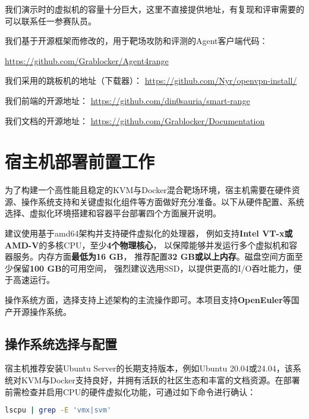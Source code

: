 \documentclass[lang=cn,10pt]{elegantbook}
\begin{document}
我们演示时的虚拟机的容量十分巨大，这里不直接提供地址，有复现和评审需要的可以联系任一参赛队员。

我们基于开源框架而修改的，用于靶场攻防和评测的Agent客户端代码：

\href{https://github.com/Grablocker/Agent4range}{https://github.com/Grablocker/Agent4range}

我们采用的跳板机的地址（下载器）：
\href{https://github.com/Nyr/openvpn-install/}{https://github.com/Nyr/openvpn-install/}

我们前端的开源地址：
\href{https://github.com/din0sauria/smart_range}{https://github.com/din0sauria/smart-range}

我们文档的开源地址：
\href{https://github.com/Grablocker/Documentation}{https://github.com/Grablocker/Documentation}





\section{宿主机部署前置工作}

为了构建一个高性能且稳定的KVM与Docker混合靶场环境，宿主机需要在硬件资源、操作系统支持和关键虚拟化组件等方面做好充分准备。以下从硬件配置、系统选择、虚拟化环境搭建和容器平台部署四个方面展开说明。

\begin{proposition}
  建议使用基于amd64架构并支持硬件虚拟化的处理器，
  例如支持\textbf{Intel VT-x或AMD-V}的多核CPU，至少\textbf{4个物理核心}，
  以保障能够并发运行多个虚拟机和容器服务。内存方面\textbf{最低为16 GB}，
  推荐配置\textbf{32 GB或以上内存}。磁盘空间方面至少保留\textbf{100 GB}的可用空间，
  强烈建议选用SSD，以提供更高的I/O吞吐能力，便于高速运行。
  
  操作系统方面，选择支持上述架构的主流操作即可。本项目支持\textbf{OpenEuler}等国产开源操作系统。
\end{proposition}


\subsection{操作系统选择与配置}

宿主机推荐安装Ubuntu Server的长期支持版本，例如Ubuntu 20.04或24.04，该系统对KVM与Docker支持良好，并拥有活跃的社区生态和丰富的文档资源。在部署前需检查并启用CPU的硬件虚拟化功能，可通过如下命令进行确认：


\begin{lstlisting}[language=bash]
  lscpu | grep -E 'vmx|svm'
\end{lstlisting}
\end{document}
